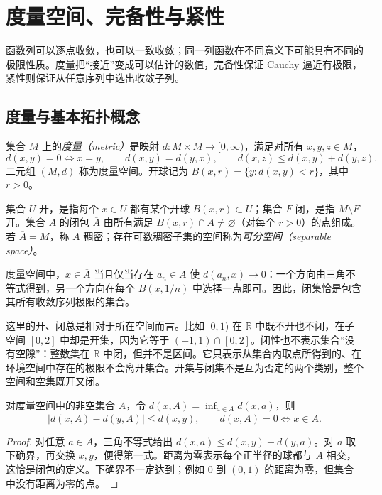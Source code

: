 \setcounter{chapter}{1} %
\chapter{度量空间、完备性与紧性}
\label{chap:fa-metric}

函数列可以逐点收敛，也可以一致收敛；同一列函数在不同意义下可能具有不同的极限性质。度量把“接近”变成可以估计的数值，完备性保证 Cauchy 逼近有极限，紧性则保证从任意序列中选出收敛子列。

\section{度量与基本拓扑概念}
\begin{definition}
集合 $M$ 上的\emph{度量（metric）}是映射 $d:M\times M\to[0,\infty)$，满足对所有 $x,y,z\in M$，
\[
 d(x,y)=0\iff x=y,\qquad d(x,y)=d(y,x),\qquad
 d(x,z)\leq d(x,y)+d(y,z).
\]
二元组 $(M,d)$ 称为度量空间。开球记为 $B(x,r)=\{y:d(x,y)<r\}$，其中 $r>0$。
\end{definition}
集合 $U$ 开，是指每个 $x\in U$ 都有某个开球 $B(x,r)\subset U$；集合 $F$ 闭，是指 $M\setminus F$ 开。集合 $A$ 的闭包 $\overline A$ 由所有满足 $B(x,r)\cap A\ne\varnothing$（对每个 $r>0$）的点组成。若 $\overline A=M$，称 $A$ 稠密；存在可数稠密子集的空间称为\emph{可分空间（separable space）}。

度量空间中，$x\in\overline A$ 当且仅当存在 $a_n\in A$ 使 $d(a_n,x)\to0$：一个方向由三角不等式得到，另一个方向在每个 $B(x,1/n)$ 中选择一点即可。因此，闭集恰是包含其所有收敛序列极限的集合。

这里的开、闭总是相对于所在空间而言。比如 $[0,1)$ 在 $\mathbb R$ 中既不开也不闭，在子空间 $[0,2]$ 中却是开集，因为它等于 $(-1,1)\cap[0,2]$。闭性也不表示集合“没有空隙”：整数集在 $\mathbb R$ 中闭，但并不是区间。它只表示从集合内取点所得到的、在环境空间中存在的极限不会离开集合。开集与闭集不是互为否定的两个类别，整个空间和空集既开又闭。

\begin{proposition}[距离函数的连续性]\label{prop:fa-distance-lipschitz}
对度量空间中的非空集合 $A$，令 $d(x,A)=\inf_{a\in A}d(x,a)$，则
\[
 |d(x,A)-d(y,A)|\leq d(x,y),\qquad
 d(x,A)=0\iff x\in\overline A.
\]
\end{proposition}
\begin{proof}
对任意 $a\in A$，三角不等式给出 $d(x,a)\leq d(x,y)+d(y,a)$。对 $a$ 取下确界，再交换 $x,y$，便得第一式。距离为零表示每个正半径的球都与 $A$ 相交，这恰是闭包的定义。下确界不一定达到；例如 $0$ 到 $(0,1)$ 的距离为零，但集合中没有距离为零的点。
\end{proof}

